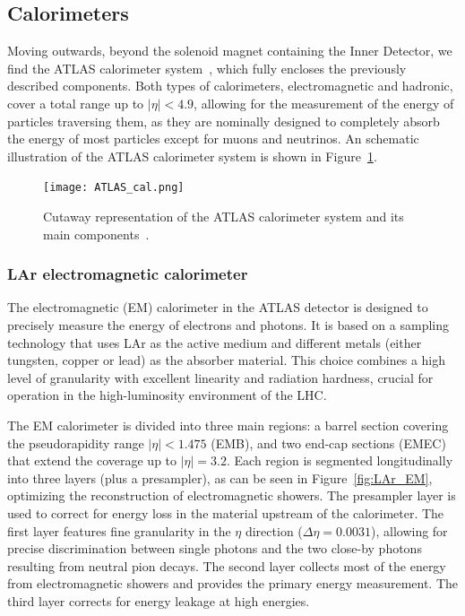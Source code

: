 \subsection{Calorimeters}
\label{sec:calo}
Moving outwards, beyond the solenoid magnet containing the Inner Detector, we find the ATLAS calorimeter system~\cite{2010_lar,2010_tile}, which fully encloses the previously described 
components. Both types of calorimeters, electromagnetic and hadronic, cover a total range up to $|\eta| < 4.9$, allowing for the measurement of the energy of particles traversing them, 
as they are nominally designed to completely absorb the energy of most particles except for muons and neutrinos. An schematic illustration of the ATLAS calorimeter system is shown in Figure~\ref{fig:cal}.
\begin{figure}[htbp]
    \centering
        \texttt{[image: ATLAS\_cal.png]}
    \caption{Cutaway representation of the ATLAS calorimeter system and its main components~\cite{ATLAS_run3}.}
    \label{fig:cal}
\end{figure}

\subsubsection{LAr electromagnetic calorimeter}
\label{sec:elelar}

The electromagnetic (EM) calorimeter in the ATLAS detector is designed to precisely measure the energy of electrons and photons. It is based on a sampling technology that uses LAr as the active medium and different metals (either tungsten, copper or lead) as the absorber material. This choice combines a high level of granularity with excellent linearity and radiation hardness, crucial for operation in the high-luminosity environment of the LHC.

The EM calorimeter is divided into three main regions: a barrel section covering the pseudorapidity range $|\eta| < 1.475$ (EMB), and two end-cap sections (EMEC) that extend the coverage up to $|\eta| = 3.2$. Each region is segmented longitudinally into three layers (plus a presampler), as can be seen in Figure~\ref{fig:LAr_EM}, optimizing the reconstruction of electromagnetic showers. The presampler layer is used to correct for energy loss in the material upstream of the calorimeter. The first layer features fine granularity in the $\eta$ direction ($\Delta\eta = 0.0031$), allowing for precise discrimination between single photons and the two close-by photons resulting from neutral pion decays. The second layer collects most of the energy from electromagnetic showers and provides the primary energy measurement. The third layer corrects for energy leakage at high energies.

